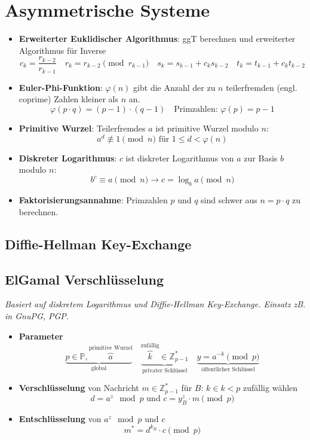 \documentclass{article}
\begin{document}

\section{Asymmetrische Systeme}
\begin{itemize}
  \item \textbf{Erweiterter Euklidischer Algorithmus}: ggT berechnen und erweiterter Algorithmus für Inverse
    \[ c_k=\frac{r_{k-2}}{r_{k-1}} \quad r_k = r_{k-2} \pmod{r_{k-1}} \quad s_k=s_{k-1}+c_ks_{k-2} \quad t_k=t_{k-1}+c_kt_{k-2} \]
  \item \textbf{Euler-Phi-Funktion}: $\varphi(n)$ gibt die Anzahl der zu $n$ teilerfremden (engl. coprime) Zahlen kleiner als $n$ an.
    \[ \varphi(p \cdot q) = (p-1) \cdot (q-1) \quad \text{Primzahlen: }\varphi(p) = p-1 \]
  \item \textbf{Primitive Wurzel}: Teilerfremdes $a$ ist primitive Wurzel modulo $n$:
    \[ a^d \not\equiv 1 \pmod{n} \text{ für } 1 \leq d < \varphi(n) \]
  \item \textbf{Diskreter Logarithmus}: $c$ ist diskreter Logarithmus von $a$ zur Basis $b$ modulo $n$:
    \[ b^c \equiv a \pmod{n} \to c = \log_b a \pmod{n} \]
  \item \textbf{Faktorisierungsannahme}: Primzahlen $p$ und $q$ sind schwer aus $n=p \cdot q$ zu berechnen.
\end{itemize}

\subsection{Diffie-Hellman Key-Exchange}


\subsection{ElGamal Verschlüsselung}
\textit{Basiert auf diskretem Logarithmus und Diffie-Hellman Key-Exchange. Einsatz zB. in GnuPG, PGP.}
\begin{itemize}
  \item \textbf{Parameter}
    \[
      \underbrace{p\in\mathbb{P}, \overbrace{a}^\text{primitive Wurzel}}_\text{global}\quad
      \underbrace{\overbrace{k}^\text{zufällig}\in\mathbb{Z}^*_{p-1}}_\text{privater Schlüssel}\quad
      \underbrace{y = a^{-k} \pmod{p}}_\text{öffentlicher Schlüssel} 
    \]
  \item \textbf{Verschlüsselung} von Nachricht $m\in\mathbb{Z}^*_{p-1}$ für $B$: $k \in k<p$ zufällig wählen
    \[ d = a^z \mod{p} \text{ und } c = y_B^z \cdot m \pmod{p} \]
  \item \textbf{Entschlüsselung} von $a^z \mod{p}$ und $c$
    \[ m^* = d^{k_B} \cdot c \pmod{p} \]
\end{itemize}
\end{document}
